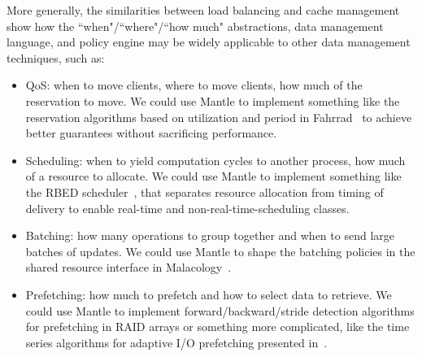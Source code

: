 More generally, the similarities between load balancing and cache management
show how the ``when"/``where"/``how much" abstractions, data management
language, and policy engine may be widely applicable to other data management
techniques, such as:

\begin{itemize}

  \item QoS: when to move clients, where to move clients, how much of the
reservation to move. We could use Mantle to implement something like the
reservation algorithms based on utilization and period in
Fahrrad~\cite{povzner_horizon_2010} to achieve better guarantees without
sacrificing performance.

  \item Scheduling: when to yield computation cycles to another process, how
much of a resource to allocate. We could use Mantle to implement something like the RBED
scheduler~\cite{brandt:rtss2003-rad}, that separates resource allocation from
timing of delivery to enable real-time and non-real-time-scheduling classes. 

  \item Batching: how many operations to group together and when to send large
batches of updates. We could use Mantle to shape the batching policies in the
shared resource interface in  Malacology~\cite{sevilla:eurosys17-malacology}. 

  \item Prefetching: how much to prefetch and how to select data to retrieve.
We could use Mantle to implement forward/backward/stride detection algorithms
for prefetching in RAID arrays or something more complicated, like the time
series algorithms for adaptive I/O prefetching presented
in~\cite{tran:sc01-arima}.

\end{itemize}
